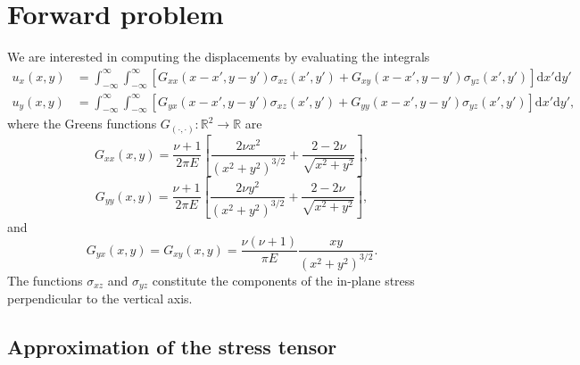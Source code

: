\documentclass{article}
\newcommand{\dd}{\mathrm{d}}
\begin{document}
\section{Forward problem}

We are interested in computing the displacements by evaluating the integrals
\begin{align}
u_x(x,y) &= \int_{-\infty}^\infty \int_{-\infty}^\infty \left[ G_{xx}(x-x',y-y') \sigma_{xz}(x',y') + G_{xy}(x-x',y-y') \sigma_{yz}(x',y')  \right] \dd x'\dd y' \\
u_y(x,y) &= \int_{-\infty}^\infty \int_{-\infty}^\infty \left[ G_{yx}(x-x',y-y') \sigma_{xz}(x',y') + G_{yy}(x-x',y-y') \sigma_{yz}(x',y')  \right] \dd x'\dd y',
\label{eq:ux}
\end{align}
where the Greens functions $G_{(\cdot,\cdot)}:\mathbb{R}^2\to\mathbb{R}$ are
\begin{equation}
G_{xx}(x,y) =  \frac{\nu+1}{2\pi E}\left[ \frac{2\nu x^2}{(x^2+y^2)^{3/2}} + \frac{2-2\nu}{\sqrt{x^2+y^2}}  \right],
\end{equation}
\begin{equation}
G_{yy}(x,y) =  \frac{\nu+1}{2\pi E}\left[ \frac{2\nu y^2}{(x^2+y^2)^{3/2}} + \frac{2-2\nu}{\sqrt{x^2+y^2}}  \right],
\end{equation}
and
\begin{equation}
G_{yx}(x,y) = G_{xy}(x,y) = \frac{\nu(\nu+1)}{\pi E} \frac{xy}{ (x^2+y^2)^{3/2}}.
\end{equation}
The functions $\sigma_{xz}$ and $\sigma_{yz}$ constitute the components of the in-plane stress perpendicular to the vertical axis.

\subsection{Approximation of the stress tensor}
\end{document}

